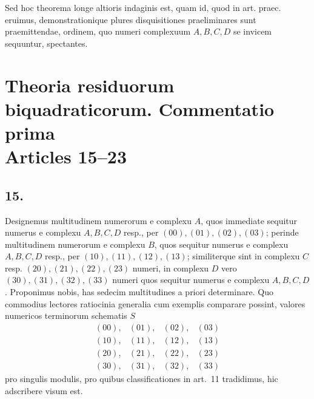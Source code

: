 \documentclass[12pt]{article}
\begin{document}
Sed hoc theorema longe altioris indaginis est, quam id, quod in art. praec. eruimus, demonstrationique plures disquisitiones praeliminares sunt praemittendae, ordinem, quo numeri complexuum $A,B,C,D$ se invicem sequuntur, spectantes.



\section*{Theoria residuorum biquadraticorum. Commentatio prima\\
Articles 15--23}

\subsection*{15.}

Designemus multitudinem numerorum e complexu $A$, quos immediate sequitur numerus e complexu $A,B,C,D$ resp., per $(00),(01),(02),(03)$; perinde multitudinem numerorum e complexu $B$, quos sequitur numerus e complexu $A,B,C,D$ resp., per $(10),(11),(12),(13)$; similiterque sint in complexu $C$ resp. $(20),(21),(22),(23)$ numeri, in complexu $D$ vero $(30),(31),(32),(33)$ numeri quos sequitur numerus e complexu $A,B,C,D$. Proponimus nobis, has sedecim multitudines a priori determinare. Quo commodius lectores ratiocinia generalia cum exemplis comparare possint, valores numericos terminorum schematis $S$
\[
\begin{array}{llll}
(00),&(01),&(02),&(03)\\
(10),&(11),&(12),&(13)\\
(20),&(21),&(22),&(23)\\
(30),&(31),&(32),&(33)
\end{array}
\]
pro singulis modulis, pro quibus classificationes in art.~11 tradidimus, hic adscribere visum est.
\end{document}
